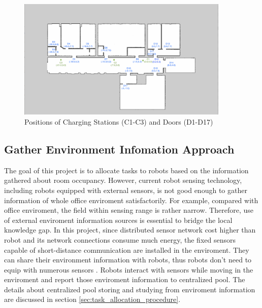 \begin{figure}[htbp]
	\centering
	\includegraphics[width = 0.9\textwidth]{content/images/ch3/positions_door_station.png}
	\caption{Positions of Charging Stations (C1-C3) and Doors (D1-D17)}
	\label{fig:positions_door_station}
\end{figure}

\subsection{Gather Environment Infomation Approach}
The goal of this project is to allocate tasks to robots based on the information gathered about room occupancy. However, current robot sensing technology, including robots equipped with external sensors, is not good enough to gather information of whole office enviroment satisfactorily. 
For example, compared with office enviroment, the field within sensing range is rather narrow. Therefore, use of external enviroment information sources is essential to bridge the local knowledge gap.
In this project, since distributed sensor network cost higher than robot and its network connections consume much energy, the fixed sensors capable of short-distance communication are installed in the enviroment. They can share their environment information with robots, thus robots don't need to equip with numerous sensors \cite{PYO2015148}.
Robots interact with sensors while moving in the enviroment and report those enviroment information to centralized pool.
The details about centralized pool storing and studying from enviroment information are discussed in section \ref{sec:task_allocation_procedure}.


